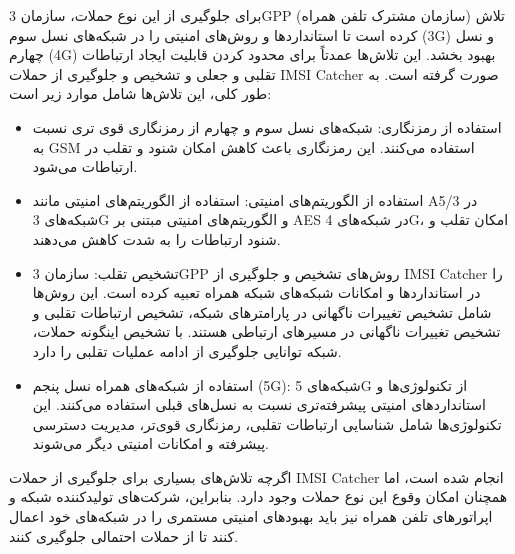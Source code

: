 \documentclass{article}
\begin{document}
برای جلوگیری از این نوع حملات، سازمان 3GPP (سازمان مشترک تلفن همراه) تلاش کرده است تا استانداردها و روش‌های امنیتی را در شبکه‌های نسل سوم (3G) و نسل چهارم (4G) بهبود بخشد. این تلاش‌ها عمدتاً برای محدود کردن قابلیت ایجاد ارتباطات تقلبی و جعلی و تشخیص و جلوگیری از حملات IMSI Catcher صورت گرفته است. به طور کلی، این تلاش‌ها شامل موارد زیر است:

\begin{itemize}

\item 
استفاده از رمزنگاری: شبکه‌های نسل سوم و چهارم از رمزنگاری قوی تری نسبت به GSM استفاده می‌کنند. این رمزنگاری باعث کاهش امکان شنود و تقلب در ارتباطات می‌شود.


\item
استفاده از الگوریتم‌های امنیتی: استفاده از الگوریتم‌های امنیتی مانند A5/3 در شبکه‌های 3G و الگوریتم‌های امنیتی مبتنی بر AES در شبکه‌های 4G، امکان تقلب و شنود ارتباطات را به شدت کاهش می‌دهند.


\item
تشخیص تقلب: سازمان 3GPP روش‌های تشخیص و جلوگیری از IMSI Catcher را در استانداردها و امکانات شبکه‌های شبکه همراه تعبیه کرده است. این روش‌ها شامل تشخیص تغییرات ناگهانی در پارامترهای شبکه، تشخیص ارتباطات تقلبی و تشخیص تغییرات ناگهانی در مسیرهای ارتباطی هستند. با تشخیص اینگونه حملات، شبکه توانایی جلوگیری از ادامه عملیات تقلبی را دارد.


\item
استفاده از شبکه‌های همراه نسل پنجم (5G): شبکه‌های 5G از تکنولوژی‌ها و استانداردهای امنیتی پیشرفته‌تری نسبت به نسل‌های قبلی استفاده می‌کنند. این تکنولوژی‌ها شامل شناسایی ارتباطات تقلبی، رمزنگاری قوی‌تر، مدیریت دسترسی پیشرفته و امکانات امنیتی دیگر می‌شوند.

\end{itemize}

اگرچه تلاش‌های بسیاری برای جلوگیری از حملات IMSI Catcher انجام شده است، اما همچنان امکان وقوع این نوع حملات وجود دارد. بنابراین، شرکت‌های تولیدکننده شبکه و اپراتورهای تلفن همراه نیز باید بهبودهای امنیتی مستمری را در شبکه‌های خود اعمال کنند تا از حملات احتمالی جلوگیری کنند.
\end{document}
